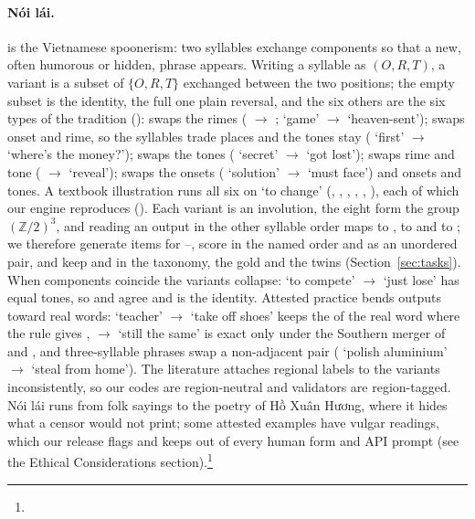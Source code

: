 \paragraph{Nói lái.}
 is the Vietnamese spoonerism: two syllables exchange components so that a new, often humorous or hidden, phrase appears. Writing a syllable as $(O, R, T)$, a variant is a subset of $\{O, R, T\}$ exchanged between the two positions; the empty subset is the identity, the full one plain reversal, and the six others are the six types of the tradition \citep{le-ho-1990-thu-choi-chu} ():  swaps the rimes ( $\rightarrow$ ;  `game' $\rightarrow$  `heaven-sent');  swaps onset and rime, so the syllables trade places and the tones stay ( `first' $\rightarrow$  `where's the money?');  swaps the tones ( `secret' $\rightarrow$  `got lost');  swaps rime and tone ( $\rightarrow$  `reveal');  swaps the onsets ( `solution' $\rightarrow$  `must face') and  onsets and tones. A textbook illustration runs all six on  `to change' (, , , , , ), each of which our engine reproduces (). Each variant is an involution, the eight form the group $(\mathbb{Z}/2)^3$, and reading an output in the other syllable order maps  to ,  to  and  to ; we therefore generate items for --, score  in the named order and as an unordered pair, and keep  and  in the taxonomy, the  gold and the  twins (Section~\ref{sec:tasks}). When components coincide the variants collapse:  `to compete' $\rightarrow$  `just lose' has equal tones, so  and  agree and  is the identity. Attested practice bends outputs toward real words:  `teacher' $\rightarrow$  `take off shoes' keeps the  of the real word where the rule gives ,  $\rightarrow$  `still the same' is exact only under the Southern merger of  and , and three-syllable phrases swap a non-adjacent pair ( `polish aluminium' $\rightarrow$  `steal from home'). The literature attaches regional labels to the variants inconsistently, so our codes are region-neutral and validators are region-tagged. Nói lái runs from folk sayings to the poetry of Hồ Xuân Hương, where it hides what a censor would not print; some attested examples have vulgar readings, which our release flags and keeps out of every human form and API prompt (see the Ethical Considerations section).\footnote{}
